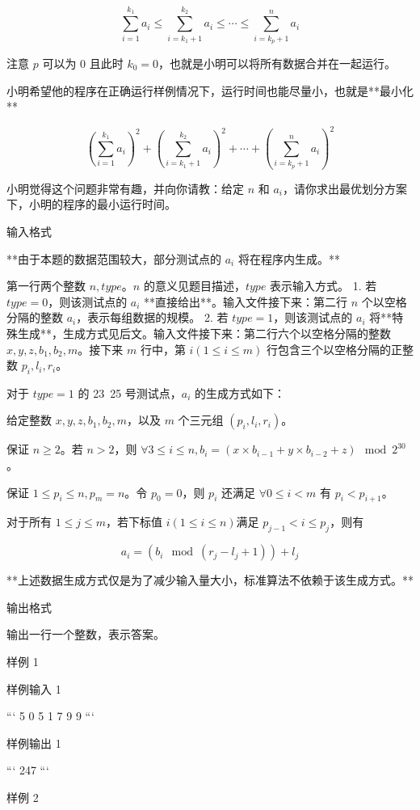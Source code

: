 \documentclass[12pt,twiside,a4paper]{ctexbook}
\numberwithin{chapter}{part}
\begin{document}
$$ \sum_{i=1}^{k_1} a_i \leq \sum_{i=k_1+1}^{k_2} a_i \leq \cdots \leq \sum_{i=k_p+1}^{n} a_i $$

注意 $p$ 可以为 $0$ 且此时 $k_0 = 0$，也就是小明可以将所有数据合并在一起运行。

小明希望他的程序在正确运行样例情况下，运行时间也能尽量小，也就是**最小化**

$$ (\sum_{i=1}^{k_1} a_i)^2 + (\sum_{i=k_1+1}^{k_2} a_i)^2 + \cdots + (\sum_{i=k_p+1}^{n} a_i)^2 $$

小明觉得这个问题非常有趣，并向你请教：给定 $n$ 和 $a_i$，请你求出最优划分方案下，小明的程序的最小运行时间。

 输入格式

**由于本题的数据范围较大，部分测试点的 $a_i$ 将在程序内生成。**

第一行两个整数 $n, type$。$n$ 的意义见题目描述，$type$ 表示输入方式。
1. 若 $type = 0$，则该测试点的 $a_i$ **直接给出**。输入文件接下来：第二行 $n$ 个以空格分隔的整数 $a_i$，表示每组数据的规模。
2. 若 $type = 1$，则该测试点的 $a_i$ 将**特殊生成**，生成方式见后文。输入文件接下来：第二行六个以空格分隔的整数 $x, y, z, b_1, b_2, m$。接下来 $m$ 行中，第 $i (1 \leq i \leq m)$ 行包含三个以空格分隔的正整数 $p_i, l_i, r_i$。

对于 $type = 1$ 的 23~25 号测试点，$a_i$ 的生成方式如下：

给定整数 $x, y, z, b_1, b_2, m$，以及 $m$ 个三元组 $(p_i, l_i, r_i)$。

保证 $n \geq 2$。若 $n > 2$，则 $\forall 3 \leq i \leq n, b_i = (x \times b_{i−1} + y \times b_{i−2} + z) \mod 2^{30}$。

保证 $1 \leq p_i \leq n, p_m = n$。令 $p_0 = 0$，则 $p_i$ 还满足 $\forall 0 \leq i < m$ 有 $p_i < p_{i+1}$。

对于所有 $1 \leq j \leq m$，若下标值 $i (1 \leq i \leq n)$满足 $p_{j−1} < i \leq p_j$，则有

$$a_i = \left(b_i \mod \left( r_j − l_j + 1 \right) \right) + l_j$$

**上述数据生成方式仅是为了减少输入量大小，标准算法不依赖于该生成方式。**

 输出格式

输出一行一个整数，表示答案。

 样例 1

 样例输入 1

```
5 0
5 1 7 9 9
```

 样例输出 1

```
247
```

 样例 2
\end{document}
